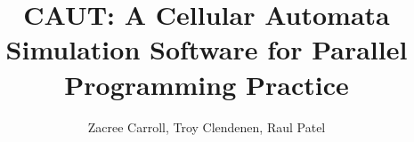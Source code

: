 \documentclass[12pt]{article}
\begin{document}
\title{CAUT: A Cellular Automata Simulation Software for Parallel Programming Practice}
\maketitle
\begin{center}
\author{Zacree Carroll, Troy Clendenen, Raul Patel}
\end{center}
\end{document}
